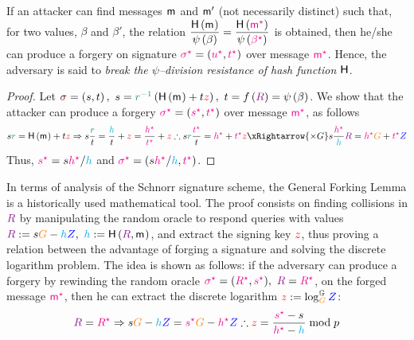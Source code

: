 \documentclass[version=submission, floatrow]{iacrcc}
\begin{document}
\begin{lemma}
    If an attacker can find messages $\mathsf{m}_{}$ and $\mathsf{m}_{}'$ (not necessarily distinct) such that, for two values, $\beta$ and $\beta'$, the relation $\dfrac{\mathsf{H}\left(\mathsf{m}_{}\right)}{\psi\left(\beta\right)} = \dfrac{\mathsf{H}\left(\textcolor{magenta}{\mathsf{m}_{}^{\star}}\right)}{\psi\left(\textcolor{magenta}{\beta^{\star}}\right)}$ is obtained, then he/she can produce a forgery on signature $\textcolor{magenta}{\sigma^{\star}} = \left(\textcolor{magenta}{u^{\star}}, \textcolor{magenta}{t^{\star}}\right)$ over message $\textcolor{magenta}{\mathsf{m}_{}^{\star}}$. Hence, the adversary is said to \emph{break the $\psi$--division resistance of hash function $\mathsf{H}$}.
\end{lemma}
\begin{proof}
    Let $\Signature{} = \left(s, t\right),\ s = \Nonce{r^{-1}}\left(\HashH{\msg{}} + t\PrivKey{z}\right),\ t = \ProjFunction{\Commitment{R}} = \psi\left(\beta\right)$. We show that the attacker can produce a forgery $\textcolor{magenta}{\sigma^{\star}} = \left(\textcolor{magenta}{s^{\star}}, \textcolor{magenta}{t^{\star}}\right)$ over message $\textcolor{magenta}{\mathsf{m}_{}^{\star}}$, as follows\[
        s\Nonce{r} = \HashH{\msg{}} + t\PrivKey{z} \Rightarrow s\dfrac{\Nonce{r}}{t} = \dfrac{\Digest{h}}{t} + \PrivKey{z} = \dfrac{\Forge{h}}{\Forge{t}} + \PrivKey{z} \therefore s\Nonce{r}\dfrac{\Forge{t}}{t} = \Forge{h} + \Forge{t}\PrivKey{z}  \xRightarrow{\times G} s\dfrac{\Forge{h}}{\Digest{h}}\Commitment{R} = \Forge{h}\GeneratorEC + \Forge{t}\PubKey{Z}
    \]
    Thus, $\textcolor{magenta}{s^{\star}} = s\textcolor{magenta}{h^{\star}}/\textcolor{cyan}{h}$ and $\textcolor{magenta}{\sigma^{\star}} = \left(s\textcolor{magenta}{h^{\star}}/\textcolor{cyan}{h}, \textcolor{magenta}{t^{\star}}\right)$.
\end{proof}

In terms of analysis of the Schnorr signature scheme, the General Forking Lemma is a historically used mathematical tool. The proof consists on finding collisions in $\Commitment{R}$ by manipulating the random oracle to respond queries with values $\Commitment{R} := s\GeneratorEC - \Digest{h}\PubKey{Z},\ \Digest{h} := \HashH{\Commitment{R}, \msg{}}$, and extract the signing key $\textcolor{red}{z}$, thus proving a relation between the advantage of forging a signature and solving the discrete logarithm problem. The idea is shown as follows: if the adversary can produce a forgery by rewinding the random oracle $\Forge{\sigma} = (\Forge{R}, \Forge{s}),\ \Commitment{R} = \Forge{R}$, on the forged message $\textcolor{magenta}{\mathsf{m}_{}^{\star}}$, then he can extract the discrete logarithm $\PrivKey{z} := \log_{\GeneratorEC}^{\Group}\PubKey{Z}$:
\begin{equation}\label{eq: schnorr-extraction}
         \Commitment{R} = \Forge{R} \Rightarrow s\GeneratorEC - \Digest{h}\PubKey{Z} = \Forge{s}\GeneratorEC - \Forge{h}\PubKey{Z} \therefore \PrivKey{z} = \dfrac{\Forge{s} - s}{\Forge{h} - \Digest{h}} \bmod{p}
\end{equation}
\end{document}
